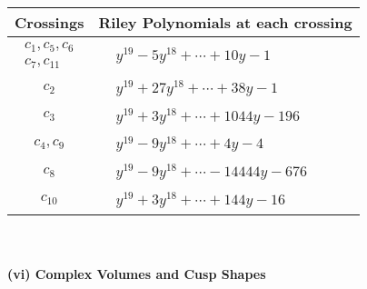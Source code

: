 \documentclass[1p]{elsarticle_modified}
\theoremstyle{definition}
\begin{document}
\begin{tabular}{m{50pt}|m{274pt}}
Crossings & \hspace{64pt}Riley Polynomials at each crossing \\
\hline $$\begin{aligned}c_{1},c_{5},c_{6}\\c_{7},c_{11}\end{aligned}$$&$\begin{aligned}
&y^{19}-5 y^{18}+\cdots+10 y-1
\end{aligned}$\\
\hline $$\begin{aligned}c_{2}\end{aligned}$$&$\begin{aligned}
&y^{19}+27 y^{18}+\cdots+38 y-1
\end{aligned}$\\
\hline $$\begin{aligned}c_{3}\end{aligned}$$&$\begin{aligned}
&y^{19}+3 y^{18}+\cdots+1044 y-196
\end{aligned}$\\
\hline $$\begin{aligned}c_{4},c_{9}\end{aligned}$$&$\begin{aligned}
&y^{19}-9 y^{18}+\cdots+4 y-4
\end{aligned}$\\
\hline $$\begin{aligned}c_{8}\end{aligned}$$&$\begin{aligned}
&y^{19}-9 y^{18}+\cdots-14444 y-676
\end{aligned}$\\
\hline $$\begin{aligned}c_{10}\end{aligned}$$&$\begin{aligned}
&y^{19}+3 y^{18}+\cdots+144 y-16
\end{aligned}$\\
\hline
\end{tabular}\\~\\
\newpage\flushleft \textbf{(vi) Complex Volumes and Cusp Shapes}
\end{document}
